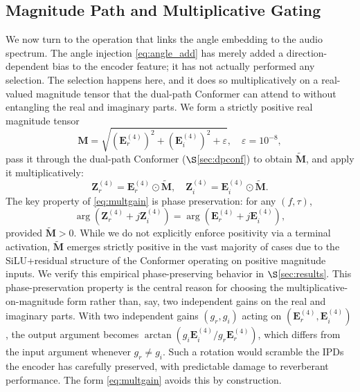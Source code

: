 \documentclass[journal,10pt]{IEEEtran}
\newcommand{\bE}{\mathbf{E}}
\newcommand{\bZ}{\mathbf{Z}}
\newcommand{\bM}{\mathbf{M}}
\begin{document}
\subsection{Magnitude Path and Multiplicative Gating}
We now turn to the operation that links the angle embedding to the audio spectrum. The angle injection \eqref{eq:angle_add} has merely added a direction-dependent bias to the encoder feature; it has not actually performed any selection. The selection happens here, and it does so multiplicatively on a real-valued magnitude tensor that the dual-path Conformer can attend to without entangling the real and imaginary parts. We form a strictly positive real magnitude tensor
\begin{equation}
\bM=\sqrt{(\bE^{(4)}_r)^2+(\bE^{(4)}_i)^2+\varepsilon},\quad\varepsilon=10^{-8},
\label{eq:mag}
\end{equation}
pass it through the dual-path Conformer (\(\S\)\ref{sec:dpconf}) to obtain \(\widetilde{\bM}\), and apply it multiplicatively:
\begin{equation}
\bZ^{(4)}_r=\bE^{(4)}_r\!\odot\widetilde{\bM},\quad \bZ^{(4)}_i=\bE^{(4)}_i\!\odot\widetilde{\bM}.
\label{eq:multgain}
\end{equation}
The key property of \eqref{eq:multgain} is phase preservation: for any \((f,\tau)\),
\begin{equation}
\arg(\bZ^{(4)}_r+j\bZ^{(4)}_i)=\arg(\bE^{(4)}_r+j\bE^{(4)}_i),
\end{equation}
provided $\widetilde{\bM}>0$. While we do not explicitly enforce positivity via a terminal activation, $\widetilde{\bM}$ emerges strictly positive in the vast majority of cases due to the SiLU+residual structure of the Conformer operating on positive magnitude inputs. We verify this empirical phase-preserving behavior in $\S$\ref{sec:results}. This phase-preservation property is the central reason for choosing the multiplicative-on-magnitude form rather than, say, two independent gains on the real and imaginary parts. With two independent gains \((g_r,g_i)\) acting on \((\bE^{(4)}_r,\bE^{(4)}_i)\), the output argument becomes \(\arctan(g_i\bE^{(4)}_i/g_r\bE^{(4)}_r)\), which differs from the input argument whenever \(g_r\neq g_i\). Such a rotation would scramble the IPDs the encoder has carefully preserved, with predictable damage to reverberant performance. The form \eqref{eq:multgain} avoids this by construction.

\end{document}
